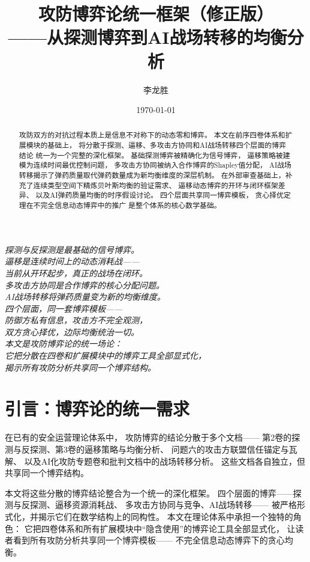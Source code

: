 \documentclass[11pt,a4paper]{article}
\title{攻防博弈论统一框架（修正版）\\
——从探测博弈到AI战场转移的均衡分析}
\author{李龙胜}
\date{\today}
\begin{document}
\maketitle

\begin{center}
\textit{
探测与反探测是最基础的信号博弈。\\
逼移是连续时间上的动态消耗战——\\
当前从开环起步，真正的战场在闭环。\\
多攻击方协同是合作博弈的核心分配问题。\\
AI战场转移将弹药质量变为新的均衡维度。\\
四个层面，同一套博弈模板——\\
防御方私有信息，攻击方不完全观测，\\
双方贪心择优，边际均衡统治一切。\\
本文是攻防博弈论的统一场论：\\
它把分散在四卷和扩展模块中的博弈工具全部显式化，\\
揭示所有攻防分析共享同一个博弈结构。
}
\end{center}

\vspace{5mm}

\begin{abstract}
攻防双方的对抗过程本质上是信息不对称下的动态零和博弈。
本文在前序四卷体系和扩展模块的基础上，
将分散于探测、逼移、多攻击方协同和AI战场转移四个层面的博弈结论
统一为一个完整的深化框架。
基础探测博弈被精确化为信号博弈，
逼移策略被建模为连续时间最优控制问题，
多攻击方协同被纳入合作博弈的Shapley值分配，
AI战场转移揭示了弹药质量取代弹药数量成为新均衡维度的深层机制。
在外部审查基础上，补充了连续类型空间下精炼贝叶斯均衡的验证需求、
逼移动态博弈的开环与闭环框架差异、
以及AI弹药质量均衡的时序假设讨论。
四个层面共享同一博弈模板，
贪心择优定理在不完全信息动态博弈中的推广
是整个体系的核心数学基础。
\end{abstract}

\tableofcontents

\section{引言：博弈论的统一需求}

在已有的安全运营理论体系中，
攻防博弈的结论分散于多个文档——
第2卷的探测与反探测、第3卷的逼移策略与均衡分析、
问题六的攻击方联盟信任锚定与瓦解、
以及AI化攻防专题卷和批判文档中的战场转移分析。
这些文档各自独立，但共享同一个博弈结构。

本文将这些分散的博弈结论整合为一个统一的深化框架。
四个层面的博弈——探测与反探测、逼移资源消耗战、
多攻击方协同与竞争、AI战场转移——
被严格形式化，并揭示它们在数学结构上的同构性。
本文在理论体系中承担一个独特的角色：
它把四卷体系和所有扩展模块中“隐含使用”的博弈论工具全部显式化，
让读者看到所有攻防分析共享同一个博弈模板——
不完全信息动态博弈下的贪心均衡。
\end{document}
